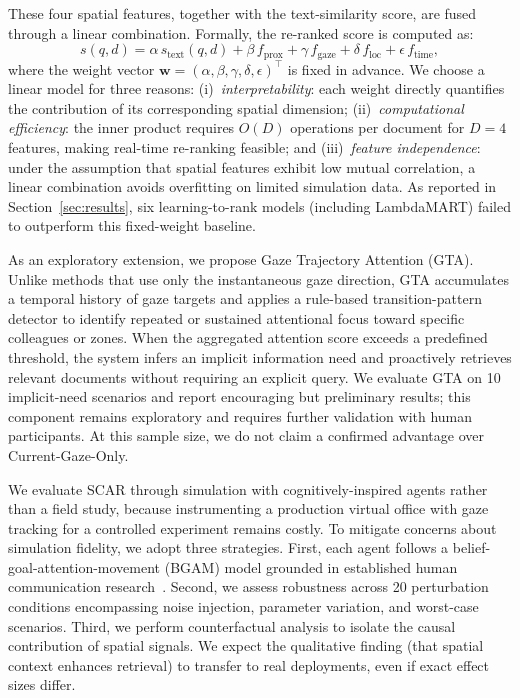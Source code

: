 \documentclass[journal]{IEEEtran}
\begin{document}
\noindent
These four spatial features, together with the text-similarity score,
are fused through a linear combination.  Formally, the re-ranked score
is computed as:
\begin{equation}
  s(q,d) = \alpha\, s_{\text{text}}(q,d)
          + \beta\, f_{\text{prox}}
          + \gamma\, f_{\text{gaze}}
          + \delta\, f_{\text{loc}}
          + \epsilon\, f_{\text{time}},
  \label{eq:intro_scar_score}
\end{equation}
where the weight vector
$\mathbf{w} = (\alpha, \beta, \gamma, \delta, \epsilon)^\top$ is fixed
in advance.  We choose a linear model for three reasons:
(i)~\emph{interpretability}: each weight directly quantifies the
contribution of its corresponding spatial dimension;
(ii)~\emph{computational efficiency}: the inner product requires
$O(D)$ operations per document for $D{=}4$ features, making
real-time re-ranking feasible;
and (iii)~\emph{feature independence}: under the assumption that
spatial features exhibit low mutual correlation, a linear combination
avoids overfitting on limited simulation data.
As reported in Section~\ref{sec:results}, six learning-to-rank models
(including LambdaMART) failed to outperform this fixed-weight baseline.

As an exploratory extension, we propose Gaze Trajectory Attention
(GTA).  Unlike methods that use only the instantaneous gaze direction,
GTA accumulates a temporal history of
gaze targets and applies a rule-based transition-pattern detector to
identify repeated or sustained attentional focus toward specific
colleagues or zones.
When the aggregated attention score exceeds a predefined threshold,
the system infers an implicit information need and proactively
retrieves relevant documents without requiring an explicit query.  We
evaluate GTA on 10 implicit-need scenarios and report encouraging but
preliminary results; this component remains exploratory and
requires further validation with human participants.  At this sample
size, we do not claim a confirmed advantage over Current-Gaze-Only.

We evaluate SCAR through simulation with cognitively-inspired agents
rather than a field study, because instrumenting a production virtual
office with gaze tracking for a controlled experiment remains costly.
To mitigate concerns about simulation fidelity, we adopt three
strategies.  First, each agent follows a
belief-goal-attention-movement (BGAM) model grounded in
established human communication research~\cite{Allen1977,
Duchowski2017, pentland_badges}.  Second, we assess robustness across
20 perturbation conditions encompassing noise injection, parameter
variation, and worst-case scenarios.  Third, we perform counterfactual
analysis to isolate the causal contribution of spatial signals.  We expect the qualitative finding (that spatial context enhances
retrieval) to transfer to real deployments, even if exact effect
sizes differ.
\end{document}
